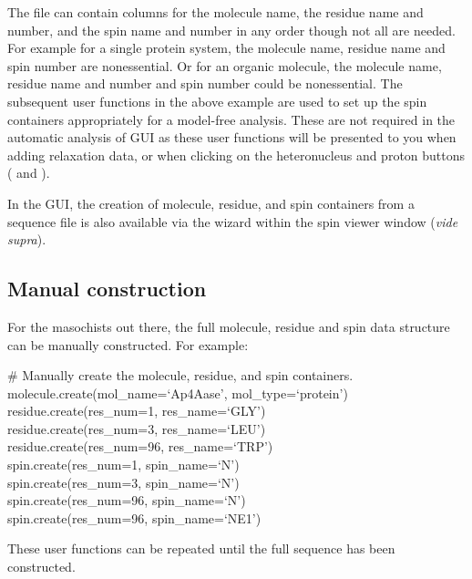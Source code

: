 The file can contain columns for the molecule name, the residue name and number, and the spin name and number in any order though not all are needed.  For example for a single protein system, the molecule name, residue name and spin number are nonessential.  Or for an organic molecule, the molecule name, residue name and number and spin number could be nonessential.  The subsequent user functions in the above example are used to set up the spin containers appropriately for a model-free analysis.  These are not required in the automatic analysis of GUI as these user functions will be presented to you when adding relaxation data, or when clicking on the heteronucleus and proton buttons ( and ).

In the GUI, the creation of molecule, residue, and spin containers from a sequence file is also available via the  wizard within the spin viewer window (\textit{vide supra}).



\subsection{Manual construction} \label{sect: script - manual construction}

For the masochists out there, the full molecule, residue and spin data structure can be manually constructed.  For example:

\begin{exampleenv}
\# Manually create the molecule, residue, and spin containers. \\
molecule.create(mol\_name=`Ap4Aase', mol\_type=`protein') \\
residue.create(res\_num=1,  res\_name=`GLY') \\
residue.create(res\_num=3,  res\_name=`LEU') \\
residue.create(res\_num=96, res\_name=`TRP') \\
spin.create(res\_num=1,  spin\_name=`N') \\
spin.create(res\_num=3,  spin\_name=`N') \\
spin.create(res\_num=96, spin\_name=`N') \\
spin.create(res\_num=96, spin\_name=`NE1')
\end{exampleenv}

These user functions can be repeated until the full sequence has been constructed.



